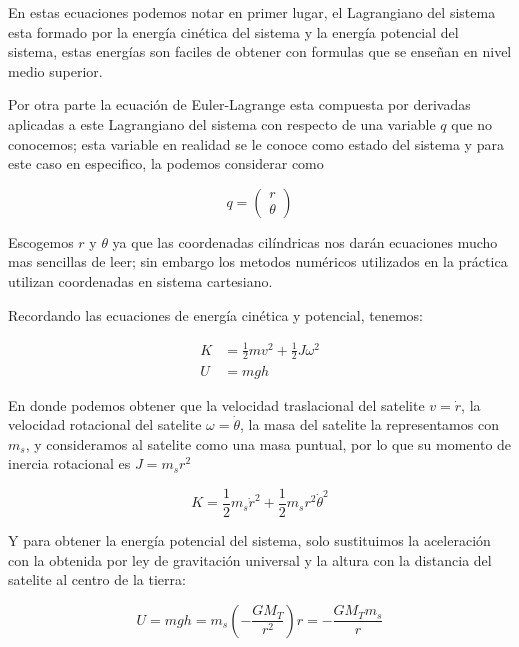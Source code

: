 \documentclass[11pt]{article}
\begin{document}
    En estas ecuaciones podemos notar en primer lugar, el Lagrangiano del
sistema esta formado por la energía cinética del sistema y la energía
potencial del sistema, estas energías son faciles de obtener con
formulas que se enseñan en nivel medio superior.

Por otra parte la ecuación de Euler-Lagrange esta compuesta por
derivadas aplicadas a este Lagrangiano del sistema con respecto de una
variable \(q\) que no conocemos; esta variable en realidad se le conoce
como estado del sistema y para este caso en especifico, la podemos
considerar como

    \begin{equation}
q = 
\begin{pmatrix}
r \\
\theta
\end{pmatrix}
\end{equation}

    Escogemos \(r\) y \(\theta\) ya que las coordenadas cilíndricas nos
darán ecuaciones mucho mas sencillas de leer; sin embargo los metodos
numéricos utilizados en la práctica utilizan coordenadas en sistema
cartesiano.

Recordando las ecuaciones de energía cinética y potencial, tenemos:

    \begin{align}
K &= \frac{1}{2} m v^2 + \frac{1}{2} J \omega^2\\
U &= mgh
\end{align}

    En donde podemos obtener que la velocidad traslacional del satelite
\(v = \dot{r}\), la velocidad rotacional del satelite
\(\omega = \dot{\theta}\), la masa del satelite la representamos con
\(m_s\), y consideramos al satelite como una masa puntual, por lo que su
momento de inercia rotacional es \(J = m_s r^2\)

    \begin{equation}
K = \frac{1}{2} m_s \dot{r}^2 + \frac{1}{2} m_s r^2 \dot{\theta}^2
\end{equation}

    Y para obtener la energía potencial del sistema, solo sustituimos la
aceleración con la obtenida por ley de gravitación universal y la altura
con la distancia del satelite al centro de la tierra:

    \begin{equation}
U = mgh = m_s \left( -\frac{G M_T}{r^2} \right) r = - \frac{G M_T m_s}{r}
\end{equation}
\end{document}
